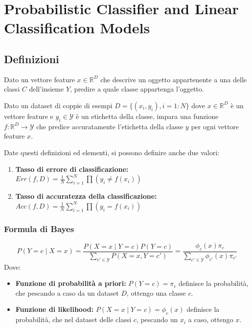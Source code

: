 \chapter{Probabilistic Classifier and Linear Classification Models}
\section{Definizioni}

\begin{defn}[Classificazione]
  Dato un vettore feature $x \in \mathbb{R}^D$ che descrive un oggetto appartenente a una delle classi $C$ dell'insieme $Y$, predire a quale classe appartenga l'oggetto.
\end{defn}

\begin{defn}
  Dato un dataset di coppie di esempi $D = \{(x_i, y_i), i = 1 : N\}$ dove $x \in \mathbb{R}^D$ è un vettore feature e $y_i \in \mathcal{Y}$ è un etichetta della classe, 
  impara una funzione $f : \mathbb{R}^D \rightarrow \mathcal{Y}$ che predice accuratamente l'etichetta della classe $y$ per ogni vettore feature $x$.
\end{defn}

Date questi definizioni ed elementi, si possono definire anche due valori:
\begin{enumerate}
  \item \textbf{Tasso di errore di classificazione:} $Err(f, D) = \frac{1}{N}\sum^N_{i=1}{\prod{(y_i \neq f(x_i))}}$
  \item \textbf{Tasso di accuratezza della classificazione:} $Acc(f, D) = \frac{1}{N}\sum^N_{i=1}{\prod{(y_i = f(x_i))}}$
\end{enumerate}

\subsection{Formula di Bayes}
\[
  P(Y = c \mid X = x) = \frac{P(X = x \mid Y = c) P(Y = c)}{\sum_{c' \in \mathcal{Y}} P(X = x, Y = c')} = \frac{\phi_c(x) \pi_c}{\sum_{c' \in \mathcal{Y}} \phi_{c'}(x) \pi_{c'}}
\]
Dove:
\begin{itemize}
  \item \textbf{Funzione di probabilità a priori:} $P(Y = c) = \pi_{c}$ definisce la probabilità, che pescando a caso da un dataset $D$, ottengo una classe $c$.
  \item \textbf{Funzione di likelihood: }$P(X = x \mid Y = c) = \phi_{c}(x)$ definisce la probabilità, che nel dataset delle classi $c$, pescando un $x_i$ a caso, ottengo $x$. 
\end{itemize}

